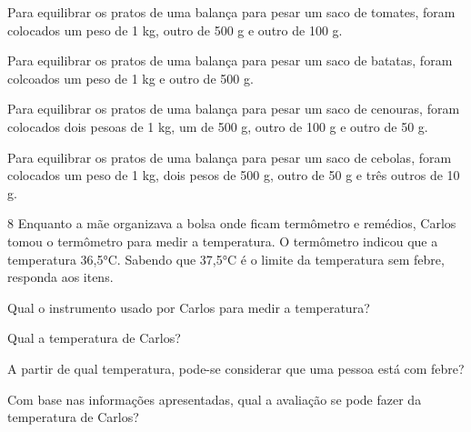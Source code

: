 \begin{escolha}
\item
  Para equilibrar os pratos de uma balança para pesar um saco de tomates, foram colocados um peso de 1 kg, outro de 500 g e outro de 100 g.\\

\item
  Para equilibrar os pratos de uma balança para pesar um saco de batatas, foram colcoados um peso de 1 kg e outro de 500 g.\\

\item
  Para equilibrar os pratos de uma balança para pesar um saco de cenouras, foram colocados dois pesoas de 1 kg, um de 500 g, outro de 100 g e outro de 50 g.\\

\item
  Para equilibrar os pratos de uma balança para pesar um saco de cebolas, foram colocados um peso de 1 kg, dois pesos de 500 g, outro de 50 g e três outros de 10 g.\\
\end{escolha}

\num{8} Enquanto a mãe organizava a bolsa onde ficam termômetro e remédios, Carlos tomou o termômetro para medir a temperatura. O termômetro indicou que a temperatura 36,5°C. Sabendo que 37,5°C é o limite da temperatura sem febre, responda aos itens.

\begin{escolha} 
\item Qual o instrumento usado por Carlos para medir a temperatura?\\

\item Qual a temperatura de Carlos?\\

\item A partir de qual temperatura, pode-se considerar que uma pessoa está com febre?\\

\item Com base nas informações apresentadas, qual a avaliação se pode fazer da temperatura de Carlos?\\
\end{escolha}


